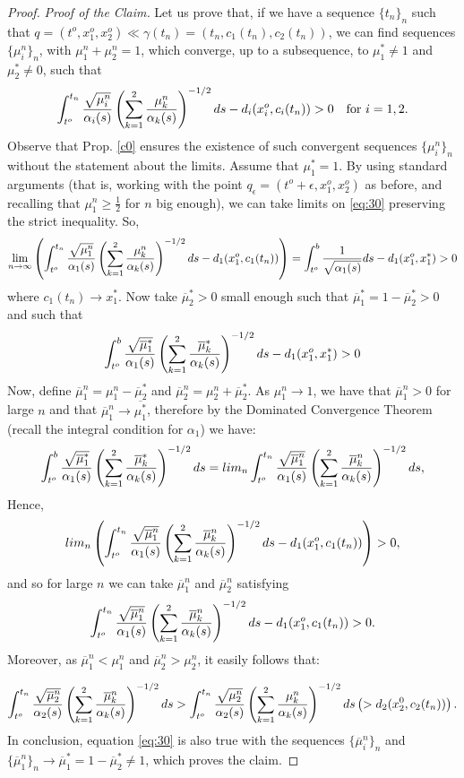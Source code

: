 \begin{proof}
{\em Proof of the Claim.} Let us prove that, if we have a sequence $\{t_n\}_n$ such that $q=(t^o,x_1^o,x_2^o)\ll \gamma(t_n)=(t_n,c_1(t_n),c_2(t_n)) $, we can find sequences $\{\mu_i^n\}_n$, with $\mu_1^n+\mu_2^n=1$, which converge, up to a subsequence, to $\mu_1^*\neq 1$ and $\mu_2^*\neq 0$, such that
\begin{equation}
  \label{eq:30}
    \int_{t^o}^{t_n} \frac{\sqrt{\mu^n_i}}{\alpha_{i}(s)}\left(\sum_{k=1}^{2} \frac{\mu^n_{k}}{\alpha_{k}(s)} \right)^{-1/2}ds-
             d_{i}(x^o_{i},c_{i}(t_n))>0\quad \hbox{for $i=1,2$.}
\end{equation}
Observe that Prop. \ref{c0} ensures the existence of such convergent sequences $\{\mu_i^n\}_n$  without the statement about the limits. Assume that $\mu_1^*= 1$. By using standard arguments (that is, working with the point $q_{\epsilon}=(t^o+\epsilon,x_1^o,x_2^o)$ as before, and recalling that $\mu_1^n\geq \frac{1}{2}$ for $n$ big enough), we can take limits on \eqref{eq:30} preserving the strict inequality. So,
\[
\lim_{n\rightarrow \infty}\left(\int_{t^o}^{t_n} \frac{\sqrt{\mu^n_1}}{\alpha_{1}(s)}\left(\sum_{k=1}^{2} \frac{\mu^n_{k}}{\alpha_{k}(s)} \right)^{-1/2}ds-
             d_{1}(x^o_{1},c_{1}(t_n))\right)=\int_{t^o}^{b}\frac{1}{\sqrt{\alpha_1(s)}}ds-
             d_{1}(x^o_{1},x_1^*)>0
           \]
where $c_1(t_n)\rightarrow x_1^*$. Now take $\overline{\mu}_2^*>0$ small enough such that $\overline{\mu}_1^*=1-\overline{\mu}_2^*>0$ and such that
           \[
\int_{t^o}^{b} \frac{\sqrt{\overline{\mu}_1^*}}{\alpha_{1}(s)}\left(\sum_{k=1}^{2} \frac{\overline{\mu}^*_k}{\alpha_{k}(s)} \right)^{-1/2}ds-d_{1}(x^o_{1},x_1^*)>0
             \]
Now, define $\overline{\mu}_1^n=\mu_1^n-\overline{\mu}_2^*$ and $\overline{\mu}_2^n=\mu_2^n+\overline{\mu}_2^*$. As $\mu_{1}^{n} \rightarrow 1$,  we have that $\overline{\mu}_{1}^{n}>0$ for large $n$ and that
$\overline{\mu}_{1}^{n} \rightarrow \overline{\mu_{1}^{*}}$, therefore by  the Dominated Convergence Theorem (recall the integral condition for $\alpha_1$) we have:
\[
\int_{t^o}^{b} \frac{\sqrt{\overline{\mu}_1^*}}{\alpha_{1}(s)}\left(\sum_{k=1}^{2} \frac{\overline{\mu}^*_k}{\alpha_{k}(s)} \right)^{-1/2}ds=lim_{n} \int_{t^o}^{t_{n}} \frac{\sqrt{\overline{\mu}_1^n}}{\alpha_{1}(s)}\left(\sum_{k=1}^{2} \frac{\overline{\mu}^n_k}{\alpha_{k}(s)} \right)^{-1/2}ds,
\]
Hence,
\[
  lim_{n}\left(\int_{t^o}^{t_{n}} \frac{\sqrt{\overline{\mu}_1^n}}{\alpha_{1}(s)}\left(\sum_{k=1}^{2} \frac{\overline{\mu}^n_k}{\alpha_{k}(s)} \right)^{-1/2}ds-d_{1}(x_{1}^{o},c_{1}(t_{n}))\right)
  >0,
\]
and so  for large $n$ we can take $\overline{\mu}_1^n$ and $\overline{\mu}_2^n$ satisfying
\[
\int_{t^o}^{t_n} \frac{\sqrt{\overline{\mu}^n_1}}{\alpha_{1}(s)}\left(\sum_{k=1}^{2} \frac{\overline{\mu}^n_{k}}{\alpha_{k}(s)} \right)^{-1/2}ds-
             d_{1}(x^o_{1},c_{1}(t_n))>0.
  \]
  Moreover, as $\overline{\mu}_1^n<\mu_1^n$ and $\overline{\mu}_2^n>\mu_2^n$, it easily follows that:

  \[
\int_{t^o}^{t_n} \frac{\sqrt{\overline{\mu}^n_2}}{\alpha_{2}(s)}\left(\sum_{k=1}^{2} \frac{\overline{\mu}^n_{k}}{\alpha_{k}(s)} \right)^{-1/2}ds>\int_{t^o}^{t_n} \frac{\sqrt{\mu^n_2}}{\alpha_{2}(s)}\left(\sum_{k=1}^{2} \frac{\mu^n_{k}}{\alpha_{k}(s)} \right)^{-1/2}ds\left(>d_2(x_2^0,c_2(t_n))\right).
    \]
In conclusion, equation \eqref{eq:30} is also true with the sequences $\{\overline{\mu}_i^n\}_n$ and $\{\overline{\mu}_1^n\}_n\rightarrow \overline{\mu}_{1}^{*}= 1-\overline{\mu}_{2}^{*}\neq 1$, which proves the claim.


\end{proof}
